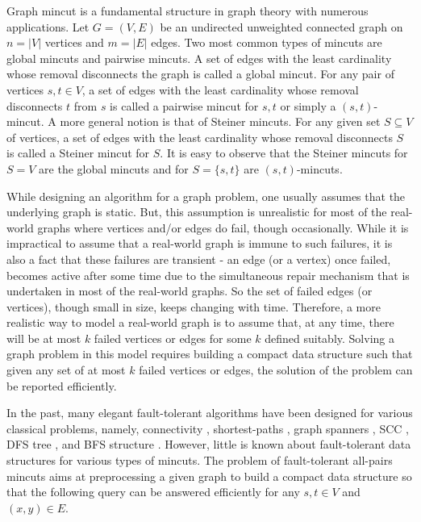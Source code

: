Graph mincut is a fundamental structure in graph theory with numerous applications. Let $G=(V,E)$ be an undirected unweighted connected graph on $n=|V|$ vertices and $m=|E|$ edges.
Two most common types of mincuts are global mincuts and pairwise mincuts. A set of edges with the least cardinality whose removal disconnects the graph is called a global mincut. For any pair of vertices $s,t\in V$, 
a set of edges with the least cardinality whose removal disconnects $t$ from $s$ is called a pairwise mincut for $s,t$ or simply a $(s,t)$-mincut. A more general notion is that of Steiner mincuts. For any given set $S\subseteq V$ of vertices, a set of edges with the least cardinality whose removal disconnects $S$ is called a Steiner mincut for $S$. It is easy to observe that the Steiner mincuts for $S=V$ are the global mincuts and for $S=\{s,t\}$ are $(s,t)$-mincuts.

While designing an algorithm for a graph problem, one usually assumes that the underlying graph is static. But, this assumption is unrealistic for most of the real-world graphs where vertices and/or edges do fail, though occasionally. While it is impractical to assume that a real-world graph is immune to such failures, it is also a fact that these failures are transient - an edge (or a vertex) once failed, becomes active after some time due to the simultaneous repair mechanism that is undertaken in most of the real-world graphs. So the set of failed edges (or vertices), though small in size, keeps changing with time. Therefore, a more realistic way to model a real-world graph is to assume that, at any time, there will be at most $k$ failed vertices or edges for some $k$ defined suitably. Solving a graph problem in this model requires building a compact data structure such that given any set of at most $k$ failed vertices or edges, the solution of the problem can be reported efficiently.

In the past, many elegant fault-tolerant algorithms have been designed for various classical problems, namely,  connectivity \cite{DBLP:conf/stoc/Chan02,DBLP:journals/algorithmica/FrigioniI00,DBLP:journals/siamcomp/ChanPR11,DBLP:conf/soda/DuanP17}, shortest-paths \cite{DBLP:conf/stoc/BernsteinK09,DBLP:journals/siamcomp/DemetrescuTCR08,DBLP:conf/stoc/ChechikC20}, graph spanners \cite{ChechikLPR10,DBLP:journals/tcs/BraunschvigCPS15}, SCC \cite{DBLP:journals/algorithmica/BaswanaCR19} , DFS tree \cite{DBLP:journals/siamcomp/BaswanaCC019}, and BFS structure \cite{DBLP:journals/talg/ParterP16,DBLP:journals/talg/ParterP18}. However, little is known about fault-tolerant data structures for various types of mincuts. The problem of fault-tolerant all-pairs mincuts aims at preprocessing a given graph to build a compact data structure so that the following query can be answered efficiently for any $s,t\in V$ and $(x,y)\in E$.\\

